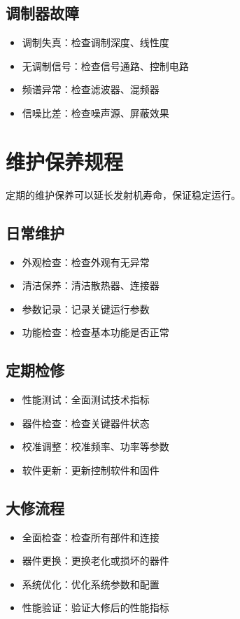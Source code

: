 \documentclass[12pt,UTF8]{ctexbook}
\begin{document}
\subsection{调制器故障}
\begin{itemize}[leftmargin=3.5em]
    \item 调制失真：检查调制深度、线性度
    \item 无调制信号：检查信号通路、控制电路
    \item 频谱异常：检查滤波器、混频器
    \item 信噪比差：检查噪声源、屏蔽效果
\end{itemize}

\section{维护保养规程}

定期的维护保养可以延长发射机寿命，保证稳定运行。

\subsection{日常维护}
\begin{itemize}[leftmargin=3.5em]
    \item 外观检查：检查外观有无异常
    \item 清洁保养：清洁散热器、连接器
    \item 参数记录：记录关键运行参数
    \item 功能检查：检查基本功能是否正常
\end{itemize}

\subsection{定期检修}
\begin{itemize}[leftmargin=3.5em]
    \item 性能测试：全面测试技术指标
    \item 器件检查：检查关键器件状态
    \item 校准调整：校准频率、功率等参数
    \item 软件更新：更新控制软件和固件
\end{itemize}

\subsection{大修流程}
\begin{itemize}[leftmargin=3.5em]
    \item 全面检查：检查所有部件和连接
    \item 器件更换：更换老化或损坏的器件
    \item 系统优化：优化系统参数和配置
    \item 性能验证：验证大修后的性能指标
\end{itemize}
\end{document}
